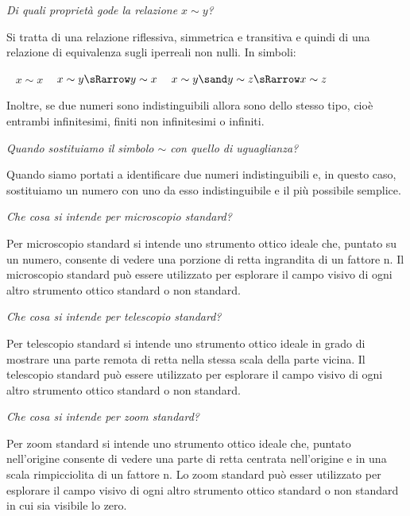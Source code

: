 \begin{esercizio}\label{ese:iper_029} 
\emph{Di quali proprietà gode la relazione \(x \sim y\)?}

Si tratta di una relazione riflessiva, simmetrica e transitiva e quindi di 
una relazione di equivalenza sugli iperreali non nulli. In simboli:
\begin{center}
\textbullet ~ \(x \sim x\) \qquad
\textbullet ~ \(x \sim y \sRarrow y \sim x\) \qquad
\textbullet ~ \(x \sim y \sand y \sim z \sRarrow x \sim z\) \qquad
\end{center}
Inoltre, se due numeri sono indistinguibili allora sono dello stesso tipo, 
cioè entrambi infinitesimi, finiti non infinitesimi o infiniti.
\end{esercizio}

\begin{esercizio}\label{ese:iper_030} 
\emph{Quando sostituiamo il simbolo \(\sim\) con quello di uguaglianza?}

Quando siamo portati a identificare due numeri indistinguibili e, in questo 
caso, sostituiamo un numero con uno da esso indistinguibile e il più 
possibile semplice.
\end{esercizio}

\begin{esercizio}\label{ese:iper_031} 
\emph{Che cosa si intende per microscopio standard?}

Per microscopio standard si intende uno strumento ottico ideale che, 
puntato su un numero, consente di vedere una porzione di retta ingrandita di 
un fattore n. 
Il microscopio standard può essere utilizzato per esplorare il campo visivo 
di ogni altro strumento ottico standard o non standard.
\end{esercizio}

\begin{esercizio}\label{ese:iper_032} 
\emph{Che cosa si intende per telescopio standard?}

Per telescopio standard si intende uno strumento ottico ideale in grado di 
mostrare una parte remota di retta nella stessa scala della parte vicina. 
Il telescopio standard può essere utilizzato per esplorare il campo visivo 
di ogni altro strumento ottico standard o non standard.
\end{esercizio}

\begin{esercizio}\label{ese:iper_033} 
\emph{Che cosa si intende per zoom standard?}

Per zoom standard si intende uno strumento ottico ideale che, puntato 
nell'origine consente di vedere una parte di retta centrata nell'origine e 
in una scala rimpicciolita di un fattore n. Lo zoom standard può esser 
utilizzato per esplorare il campo visivo di ogni altro strumento ottico 
standard o non standard in cui sia visibile lo zero.
\end{esercizio}

